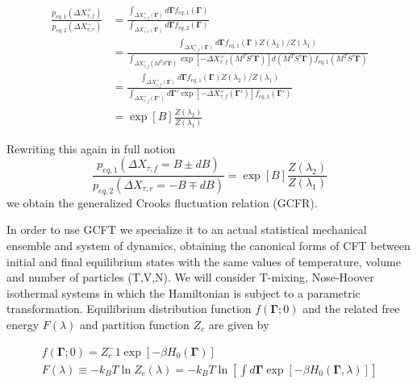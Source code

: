 \documentclass[a4paper,12pt]{article}
\begin{document}
\begin{equation}
\begin{aligned}
\frac{p_{eq,1}(\Delta X_{\tau,f}^+)}{p_{eq,2}(\Delta X_{\tau,r}^-)}
&=\frac{\int_{\Delta X_{\tau,f}^+(\bm{\Gamma})} d\bm{\Gamma} f_{eq,1}(\bm{\Gamma})}{\int_{\Delta X_{\tau,r}^-(\bm{\Gamma})} d\bm{\Gamma} f_{eq,2}(\bm{\Gamma})} \\
&= \frac{\int_{\Delta X_{\tau,f}^+(\bm{\Gamma})} d\bm{\Gamma} f_{eq,1}(\bm{\Gamma})Z(\lambda_2)/Z(\lambda_1)}{\int_{\Delta X_{\tau,f}^+(M^T S^{\tau}\bm{\Gamma})} \exp[-\Delta X_{\tau,f}^+(M^T S^{\tau}\bm{\Gamma})] d(M^T S^{\tau}\bm{\Gamma}) f_{eq,1}(M^T S^{\tau}\bm{\Gamma})} \\
&=\frac{\int_{\Delta X_{\tau,f}^+(\bm{\Gamma})} d\bm{\Gamma} f_{eq,1}(\bm{\Gamma}) Z(\lambda_2)/Z(\lambda_1)}{\int_{\Delta X_{\tau,f}^+(\bm{\Gamma}')} d\bm{\Gamma}' \exp[-\Delta X_{\tau,f}^+(\bm{\Gamma}')] f_{eq,1}(\bm{\Gamma}')} \\
&= \exp[B] \frac{Z(\lambda_2)}{Z(\lambda_1)}
\end{aligned}
\end{equation}

Rewriting this again in full notion
\begin{equation}
\label{GCFR}
\frac{p_{eq,1}(\Delta X_{\tau,f}=B\pm dB)}{p_{eq,2}(\Delta X_{\tau,r}=-B\mp dB)}= \exp[B] \frac{Z(\lambda_2)}{Z(\lambda_1)}
\end{equation}
we obtain the generalized Crooks fluctuation relation (GCFR).

In order to use GCFT we specialize it to an actual statistical mechanical ensemble and system of dynamics, obtaining the canonical forms of CFT between initial and final equilibrium states with the same values of temperature, volume and number of particles (T,V,N). We will consider T-mixing, Nose-Hoover isothermal systems in which the Hamiltonian is subject to a parametric transformation. Equilibrium distribution function $f(\bm{\Gamma};0)$ and the related free energy $F(\lambda)$ and partition function $Z_c$ are given by

\begin{equation}
\begin{aligned}
  f(\bm{\Gamma};0)=Z_c^-1 \exp[-\beta H_0(\bm{\Gamma})]\\
  F(\lambda)\equiv - k_B T \ln Z_c(\lambda) = -k_B T \ln[\int d\bm{\Gamma} \exp[-\beta H_0(\bm{\Gamma},\lambda)]]
\end{aligned}
\end{equation}
\end{document}
